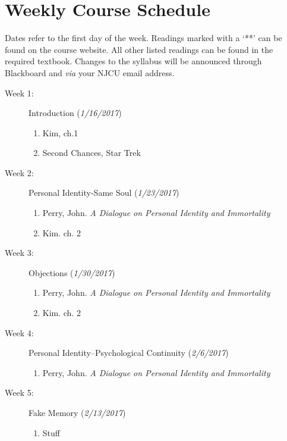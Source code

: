 \documentclass[article,oneside]{memoir}
\begin{document}
\section{Weekly Course Schedule}
Dates refer to the first day of the week. Readings marked with a `**' can be found on the course website. All other listed readings can be found in the required textbook. Changes to the syllabus will be announced through Blackboard and \emph{via} your NJCU email address. \newline





\begin{description}

\item[Week 1: ] Introduction (\emph{1/16/2017})
\begin{enumerate}
\item Kim, ch.1
\item Second Chances, Star Trek
\end{enumerate}

\item[Week 2:]  Personal Identity-Same Soul (\emph{1/23/2017})
\begin{enumerate}
\item Perry, John. \emph{A Dialogue on Personal Identity and Immortality}
\item Kim. ch. 2
\end{enumerate}


\item[Week 3:]  Objections (\emph{1/30/2017})
\begin{enumerate}
\item Perry, John. \emph{A Dialogue on Personal Identity and Immortality}
\item Kim. ch. 2
\end{enumerate}


\item[Week 4: ] Personal Identity--Psychological Continuity (\emph{2/6/2017})
\begin{enumerate}
\item Perry, John. \emph{A Dialogue on Personal Identity and Immortality}
\end{enumerate}

\item[Week 5: ] Fake Memory (\emph{2/13/2017})
\begin{enumerate}
\item Stuff
 \end{enumerate}
 

\end{description}
\end{document}
